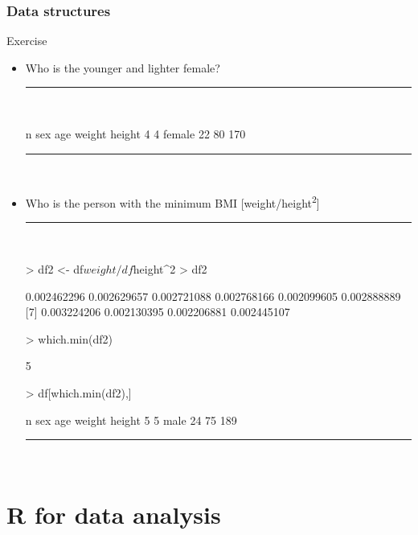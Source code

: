 \documentclass{beamer}
\begin{document}
\begin{frame}[fragile]
	\frametitle{Data structures}
	\centering \LARGE Exercise
	\begin{itemize}
		\small
		\item Who is the younger and lighter female?
\pause
\rule{\textwidth}{0.4pt}\\
\tiny
\setlength{\fancyvrbtopsep}{-1pt}
\setlength{\fancyvrbpartopsep}{-1pt}
\begin{Schunk}
\begin{Soutput}
  n    sex age weight height
4 4 female  22     80    170
\end{Soutput}
\end{Schunk}
\rule{\textwidth}{0.4pt}\\
\small
\pause
		\item Who is the person with the minimum BMI \tiny [weight/height\textsuperscript{2}]
\pause
\rule{\textwidth}{0.4pt}\\
\tiny
\setlength{\fancyvrbtopsep}{-1pt}
\setlength{\fancyvrbpartopsep}{-1pt}
\begin{Schunk}
\begin{Sinput}
> df2 <- df$weight / df$height^2
> df2
\end{Sinput}
\begin{Soutput}
 [1] 0.002462296 0.002629657 0.002721088 0.002768166 0.002099605 0.002888889
 [7] 0.003224206 0.002130395 0.002206881 0.002445107
\end{Soutput}
\begin{Sinput}
> which.min(df2)
\end{Sinput}
\begin{Soutput}
[1] 5
\end{Soutput}
\begin{Sinput}
> df[which.min(df2),]
\end{Sinput}
\begin{Soutput}
  n  sex age weight height
5 5 male  24     75    189
\end{Soutput}
\end{Schunk}
\rule{\textwidth}{0.4pt}\\
\small
	\end{itemize}
\end{frame}



\section{R for data analysis}
\end{document}
